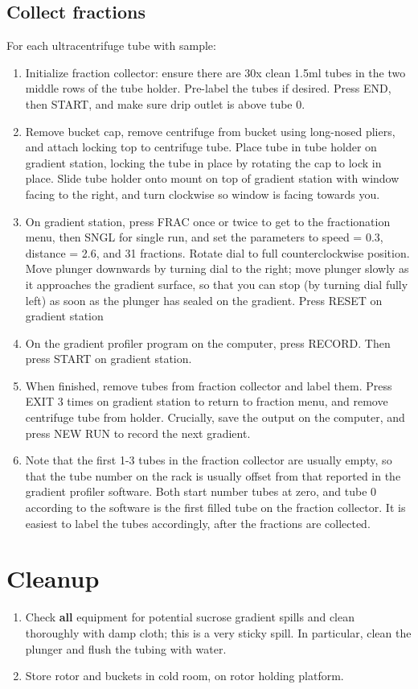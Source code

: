 \documentclass{article}
\begin{document}
\subsection{Collect fractions}

For each ultracentrifuge tube with sample:
\begin{enumerate}
  \item Initialize fraction collector: ensure there are  30x clean 1.5ml tubes in the two middle rows of the tube holder. Pre-label the tubes if desired. Press END, then START, and make sure drip outlet is above tube 0.
  \item Remove bucket cap, remove centrifuge from bucket using long-nosed pliers, and attach locking top to centrifuge tube. Place tube in tube holder on gradient station, locking the tube in place by rotating the cap to lock in place.  Slide tube holder onto mount on top of gradient station with window facing to the right, and turn clockwise so window is facing towards you. 
  \item On gradient station, press FRAC once or twice to get to the fractionation menu, then SNGL for single run, and set the parameters to speed = 0.3, distance = 2.6, and 31 fractions. Rotate dial to full counterclockwise position. 
Move plunger downwards by turning dial to the right; move plunger slowly as it approaches the gradient surface, so that you can stop (by turning dial fully left) as soon as the plunger has sealed on the gradient. Press RESET on gradient station
  \item On the gradient profiler program on the computer, press RECORD. Then press START on gradient station. 
  \item When finished, remove tubes from fraction collector and label them. Press EXIT 3 times on gradient station to return to fraction menu, and remove centrifuge tube from holder. Crucially, save the output on the computer, and press NEW RUN to record the next gradient.
  \item Note that the first 1-3 tubes in the fraction collector are usually empty, so that the tube number on the rack is usually offset from that reported in the gradient profiler software. Both start number tubes at zero, and tube 0 according to the software is the first filled tube on the fraction collector. It is easiest to label the tubes accordingly, after the fractions are collected.
\end{enumerate}

\section{Cleanup}
\begin{enumerate}
  \item Check \textbf{all} equipment for potential sucrose gradient spills and clean thoroughly with damp cloth; this is a very sticky spill. In particular, clean the plunger and flush the tubing with water.
    \item Store rotor and buckets in cold room, on rotor holding platform. 
\end{enumerate}
%
%
\end{document}
